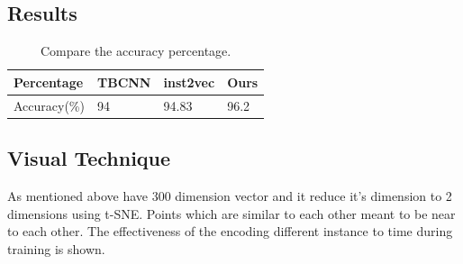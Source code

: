 \subsection{Results}
\begin{table}[h]
\begin{tabular}{l l l l}
\hline
Percentage & TBCNN & inst2vec &  Ours\\
\hline
Accuracy(\%) & 94 & 94.83 & 96.2 \\
\hline
\end{tabular}
\centering
\caption{Compare the accuracy percentage.}
\label{tab-acc}
\end{table}

\subsection{Visual Technique}
As mentioned above have 300 dimension vector and it reduce it's dimension to 2 dimensions using t-SNE\cite{}. Points which are similar to each other meant to be near to each other. The effectiveness of the encoding different instance to time during training is shown.

